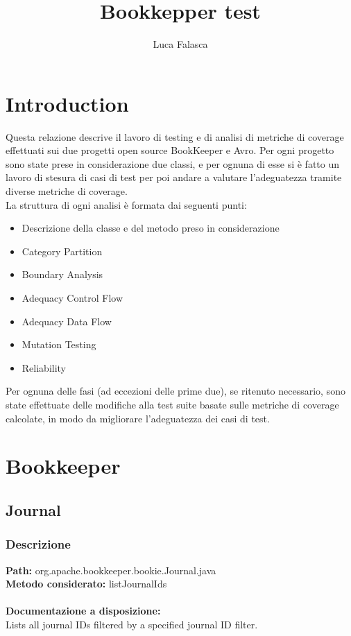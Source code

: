 \documentclass[12pt, a4paper]{article}
\title{Bookkepper test}
\author{Luca Falasca}
\begin{document}
\maketitle

\thispagestyle{empty}
\tableofcontents

\listoffigures
\listoftables
{}

\thispagestyle{empty}
\newpage
\setcounter{page}{1}
\section{Introduction}
Questa relazione descrive il lavoro di testing e di analisi di metriche di coverage
 effettuati sui due progetti open source BookKeeper e Avro.
Per ogni progetto sono state prese in considerazione due classi, e per ognuna di esse
si è fatto un lavoro di stesura di casi di test per poi andare a valutare l'adeguatezza
tramite diverse metriche di coverage. \\
La struttura di ogni analisi è formata dai seguenti punti: 
\begin{itemize}
  \item Descrizione della classe e del metodo preso in considerazione
  \item Category Partition
  \item Boundary Analysis
  \item Adequacy Control Flow
  \item Adequacy Data Flow
  \item Mutation Testing
  \item Reliability
\end{itemize} 
Per ognuna delle fasi (ad eccezioni delle prime due), se ritenuto necessario, sono state effettuate delle modifiche
alla test suite basate sulle metriche di coverage calcolate, in modo da migliorare l'adeguatezza dei casi di test.
\section{Bookkeeper}
\subsection{Journal}

\subsubsection{Descrizione}
\textbf{Path:} org.apache.bookkeeper.bookie.Journal.java \\
\textbf{Metodo considerato:} listJournalIds \\ \\
\textbf{Documentazione a disposizione:} \\
Lists all journal IDs filtered by a specified journal ID filter.
\end{document}
